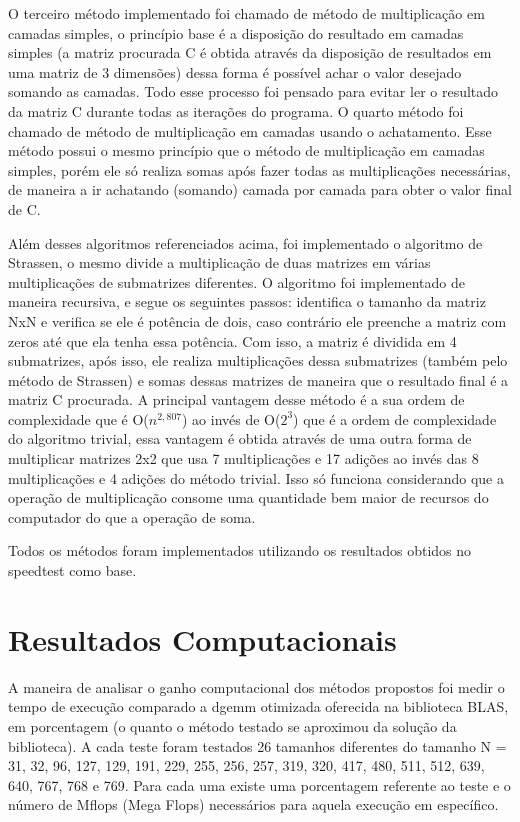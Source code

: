 \documentclass[a4paper, 10pt]{article}
\begin{document}
O terceiro método implementado foi chamado de método de multiplicação em camadas simples, o princípio base é a disposição do resultado em camadas simples (a matriz procurada C é obtida através da disposição de resultados em uma matriz de 3 dimensões) dessa forma é possível achar o valor desejado somando as camadas. Todo esse processo foi pensado para evitar ler o resultado da matriz C durante todas as iterações do programa.
O quarto método foi chamado de método de multiplicação em camadas usando o achatamento. Esse método possui o mesmo princípio que o método de multiplicação em camadas simples, porém ele só realiza somas após fazer todas as multiplicações necessárias, de maneira a ir achatando (somando) camada por camada para obter o valor final de C.

Além desses algoritmos referenciados  acima, foi implementado o algoritmo de Strassen, o mesmo divide a multiplicação de duas matrizes em várias multiplicações de submatrizes diferentes. O algoritmo foi implementado de maneira recursiva, e segue os seguintes passos: identifica o tamanho da matriz NxN e verifica se ele é potência de dois, caso contrário ele preenche a matriz com zeros até que ela tenha essa potência. Com isso, a matriz é dividida em 4 submatrizes, após isso, ele realiza multiplicações dessa submatrizes (também pelo método de Strassen) e somas dessas matrizes de maneira que o resultado final é a matriz C procurada. A principal vantagem desse método é a sua ordem de complexidade que é O($n^{2,807}$) ao invés de O($2^{3}$) que é a ordem de complexidade do algoritmo trivial, essa vantagem é obtida através de uma outra forma de multiplicar matrizes 2x2 que usa 7 multiplicações e 17 adições ao invés das 8 multiplicações e 4 adições do método trivial. Isso só funciona considerando que a operação de multiplicação consome uma quantidade bem maior de recursos do computador do que a operação de soma.

Todos os métodos foram implementados utilizando os resultados obtidos no speedtest como base.

\newpage
\section{Resultados Computacionais}
 A maneira de analisar o ganho computacional dos métodos propostos foi medir o tempo de execução comparado a dgemm otimizada oferecida na biblioteca BLAS, em porcentagem (o quanto o método testado se aproximou da solução da biblioteca). A cada teste foram testados 26 tamanhos diferentes do tamanho N = 31, 32, 96, 127, 129, 191, 229, 255, 256, 257, 319, 320, 417, 480, 511, 512, 639, 640, 767, 768 e 769. Para cada uma existe uma porcentagem referente ao teste e o número de Mflops (Mega Flops) necessários para aquela execução em específico. 
\end{document}
